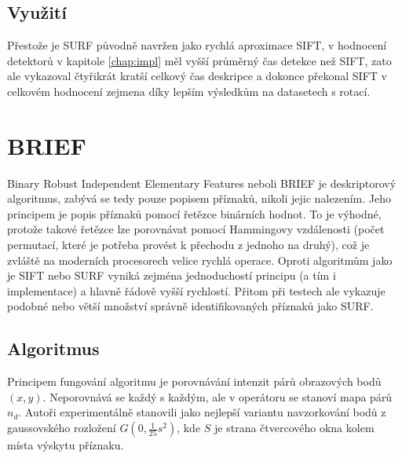 	\subsection{Využití}
		
		Přestože je SURF původně navržen jako rychlá aproximace SIFT, v hodnocení detektorů v kapitole \ref{chap:impl} měl vyšší průměrný čas detekce než SIFT, zato ale vykazoval čtyřikrát kratší celkový čas deskripce a dokonce překonal SIFT v celkovém hodnocení zejmena díky lepším výsledkům na datasetech s rotací. 

\section{BRIEF}
\label{sec:brief}
	Binary Robust Independent Elementary Features neboli BRIEF \cite{calonder2010brief} je deskriptorový algoritmus, zabývá se tedy pouze popisem příznaků, nikoli jejic nalezením. Jeho principem je popis příznaků pomocí řetězce binárních hodnot. To je výhodné, protože takové řetězce lze porovnávat pomocí Hammingovy vzdálenosti (počet permutací, které je potřeba provést k přechodu z jednoho na druhý), což je zvláště na moderních procesorech velice rychlá operace. Oproti algoritmům jako je SIFT nebo SURF vyniká zejména jednoduchostí principu (a tím i implementace) a hlavně řádově vyšší rychlostí. Přitom při testech ale vykazuje podobné nebo větší množství správně identifikovaných příznaků jako SURF.
	
	\subsection{Algoritmus}
		
		Principem fungování algoritmu je porovnávání intenzit párů obrazových bodů $(x,y)$. Neporovnává se každý s každým, ale v operátoru se stanoví mapa párů $n_d$. Autoři experimentálně stanovili jako nejlepší variantu navzorkování bodů z gaussovského rozložení $G(0, \frac{1}{25}s^2)$, kde $S$ je strana čtvercového okna kolem místa výskytu příznaku.
		
